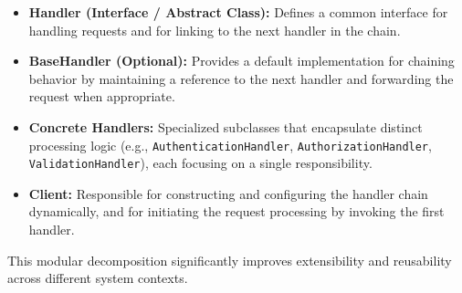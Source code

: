 \begin{itemize}
    \item \textbf{Handler (Interface / Abstract Class):} Defines a common interface for handling requests and for linking to the next handler in the chain.
    
    \item \textbf{BaseHandler (Optional):} Provides a default implementation for chaining behavior by maintaining a reference to the next handler and forwarding the request when appropriate.
    
    \item \textbf{Concrete Handlers:} Specialized subclasses that encapsulate distinct processing logic (e.g., \texttt{\allowbreak AuthenticationHandler}, \texttt{AuthorizationHandler}, \texttt{ValidationHandler}), each focusing on a single responsibility.
    
    \item \textbf{Client:} Responsible for constructing and configuring the handler chain dynamically, and for initiating the request processing by invoking the first handler.
\end{itemize}

This modular decomposition significantly improves extensibility and reusability across different system contexts.

